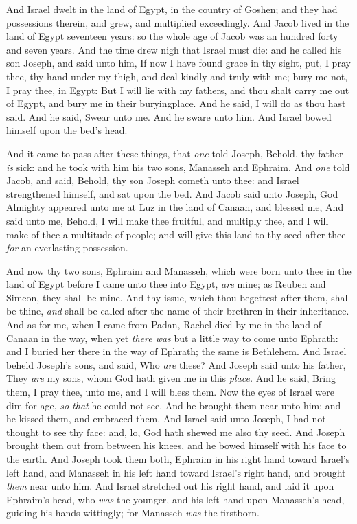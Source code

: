 \documentclass[11pt,letterpaper,oneside]{memoir}
\begin{document}
And Israel dwelt in the land of Egypt, in the country of Goshen; and
they had possessions therein, and grew, and multiplied exceedingly. And
Jacob lived in the land of Egypt seventeen years: so the whole age of
Jacob was an hundred forty and seven years. And the time drew nigh that
Israel must die: and he called his son Joseph, and said unto him, If now
I have found grace in thy sight, put, I pray thee, thy hand under my
thigh, and deal kindly and truly with me; bury me not, I pray thee, in
Egypt: But I will lie with my fathers, and thou shalt carry me out of
Egypt, and bury me in their buryingplace. And he said, I will do as thou
hast said. And he said, Swear unto me. And he sware unto him. And Israel
bowed himself upon the bed's head.

And it came to pass after these things, that \emph{one} told Joseph,
Behold, thy father \emph{is} sick: and he took with him his two sons,
Manasseh and Ephraim. And \emph{one} told Jacob, and said, Behold, thy
son Joseph cometh unto thee: and Israel strengthened himself, and sat
upon the bed. And Jacob said unto Joseph, God Almighty appeared unto me
at Luz in the land of Canaan, and blessed me, And said unto me, Behold,
I will make thee fruitful, and multiply thee, and I will make of thee a
multitude of people; and will give this land to thy seed after thee
\emph{for} an everlasting possession.

And now thy two sons, Ephraim and Manasseh, which were born unto thee in
the land of Egypt before I came unto thee into Egypt, \emph{are} mine;
as Reuben and Simeon, they shall be mine. And thy issue, which thou
begettest after them, shall be thine, \emph{and} shall be called after
the name of their brethren in their inheritance. And as for me, when I
came from Padan, Rachel died by me in the land of Canaan in the way,
when yet \emph{there was} but a little way to come unto Ephrath: and I
buried her there in the way of Ephrath; the same is Bethlehem. And
Israel beheld Joseph's sons, and said, Who \emph{are} these? And Joseph
said unto his father, They \emph{are} my sons, whom God hath given me in
this \emph{place.} And he said, Bring them, I pray thee, unto me, and I
will bless them. Now the eyes of Israel were dim for age, \emph{so that}
he could not see. And he brought them near unto him; and he kissed them,
and embraced them. And Israel said unto Joseph, I had not thought to see
thy face: and, lo, God hath shewed me also thy seed. And Joseph brought
them out from between his knees, and he bowed himself with his face to
the earth. And Joseph took them both, Ephraim in his right hand toward
Israel's left hand, and Manasseh in his left hand toward Israel's right
hand, and brought \emph{them} near unto him. And Israel stretched out
his right hand, and laid it upon Ephraim's head, who \emph{was} the
younger, and his left hand upon Manasseh's head, guiding his hands
wittingly; for Manasseh \emph{was} the firstborn.
\end{document}
